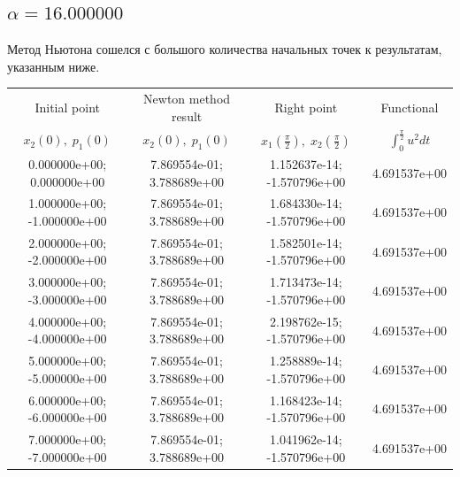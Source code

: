 \documentclass[titlepage]{article}
\def\l{\left}
\def\r{\right}
\begin{document}
\subsection{$\alpha = 16.000000$} 
Метод Ньютона сошелся с большого количества начальных точек к результатам, указанным ниже. \\ 
\begin{tabular}{ | c | c | c | c |} 
\hline 
Initial point  & Newton method result & Right point & Functional 
 \\ $x_2(0), \; p_1(0)$ & $x_2(0), \; p_1(0)$ & $x_1\l(\frac{\pi}{2}\r), \; x_2\l(\frac{\pi}{2}\r)$ & $\int_{0}^{\frac{\pi}{2}}u^2dt$  \\ \hline 
0.000000e+00; 0.000000e+00 & 7.869554e-01; 3.788689e+00 & 1.152637e-14; -1.570796e+00 & 4.691537e+00 \\ \hline 
1.000000e+00; -1.000000e+00 & 7.869554e-01; 3.788689e+00 & 1.684330e-14; -1.570796e+00 & 4.691537e+00 \\ \hline 
2.000000e+00; -2.000000e+00 & 7.869554e-01; 3.788689e+00 & 1.582501e-14; -1.570796e+00 & 4.691537e+00 \\ \hline 
3.000000e+00; -3.000000e+00 & 7.869554e-01; 3.788689e+00 & 1.713473e-14; -1.570796e+00 & 4.691537e+00 \\ \hline 
4.000000e+00; -4.000000e+00 & 7.869554e-01; 3.788689e+00 & 2.198762e-15; -1.570796e+00 & 4.691537e+00 \\ \hline 
5.000000e+00; -5.000000e+00 & 7.869554e-01; 3.788689e+00 & 1.258889e-14; -1.570796e+00 & 4.691537e+00 \\ \hline 
6.000000e+00; -6.000000e+00 & 7.869554e-01; 3.788689e+00 & 1.168423e-14; -1.570796e+00 & 4.691537e+00 \\ \hline 
7.000000e+00; -7.000000e+00 & 7.869554e-01; 3.788689e+00 & 1.041962e-14; -1.570796e+00 & 4.691537e+00 \\ \hline 
\end{tabular} 
\end{document}
